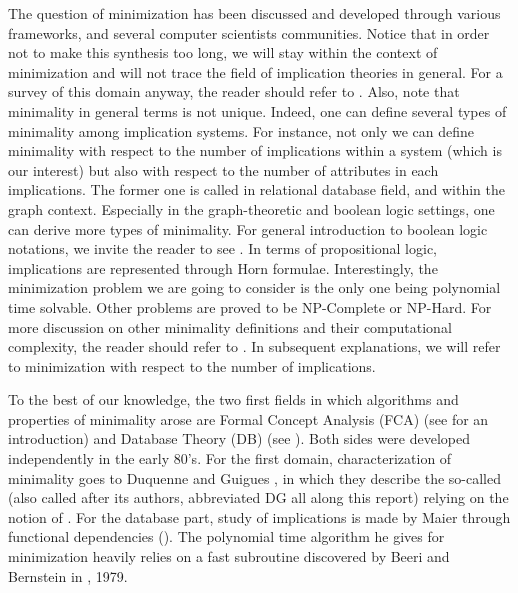 The question of minimization has been discussed and developed through various 
frameworks, and several computer scientists communities. Notice that in order 
not to make this synthesis too long, we will stay within the context of 
minimization and will not trace the field of implication theories in general. 
For a survey of this domain anyway, the reader should refer to 
\cite{wild_joy_2017}. Also, note that minimality in general terms is not 
unique. Indeed, one can define several types of minimality among implication 
systems. For instance, not only we can define minimality with respect to the 
number of implications within a system (which is our interest) but also with 
respect to the number of attributes in each implications. The former one is 
called  in relational database field, and  within the graph context. Especially in the graph-theoretic and 
boolean logic settings, one can derive more types of minimality. For general 
introduction to boolean logic notations, we invite the reader to see 
\cite{cori_mathematical_2000}. In terms of propositional logic, implications 
are represented through Horn formulae. Interestingly, the minimization problem 
we are going to consider is the only one being polynomial time solvable. Other 
problems are proved to be NP-Complete or NP-Hard. For more discussion on other 
minimality definitions and their computational complexity, the reader should 
refer to \cite{boros_strong_2017, ausiello_directed_2017, 
ganter_conceptual_2016, ausiello_minimal_1986, wild_joy_2017, 
boros_horn_1998, hammer_optimal_1993}. In subsequent explanations, we will refer to minimization with respect to the number of implications.

\vspace{1.2em}

To the best of our knowledge, the two first fields in which algorithms and 
properties of minimality arose are Formal Concept Analysis (FCA) (see 
\cite{ganter_formal_1999, 
	ganter_two_2010} for an introduction) and Database Theory (DB) (see 
\cite{maier_theory_1983}). Both sides were developed independently in the early 
80's. For the first domain, characterization of minimality goes to Duquenne and 
Guigues \cite{guigues_familles_1986}, in which they describe the so-called 
 (also called  after its 
authors, abbreviated DG all along this report) relying on the notion of . For the database part, study of implications is made by Maier through functional dependencies (\cite{maier_theory_1983, maier_minimum_1980}). The polynomial time algorithm he gives for minimization heavily relies on a fast subroutine discovered by Beeri and Bernstein in \cite{beeri_computational_1979}, 1979.

